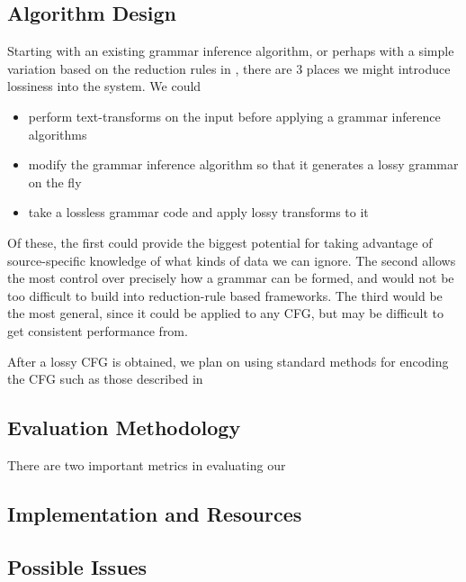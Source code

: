 \documentclass[11pt]{article}
\begin{document}
\subsection{Algorithm Design}

Starting with an existing grammar inference algorithm, or perhaps with a
simple variation based
on the reduction rules in \cite{grammarcodes}, there are 3 places we might introduce
lossiness into the system. We could
\begin{itemize}
\item perform text-transforms on the input before applying a 
      grammar inference algorithms
\item modify the grammar inference algorithm so that it generates a lossy
      grammar on the fly
\item take a lossless grammar code and apply lossy transforms to it
\end{itemize}

Of these, the first could provide the biggest potential for taking advantage of
source-specific knowledge of what kinds of data we can ignore. The second
allows the most control over precisely how a grammar can be formed, and would not
be too difficult to build into reduction-rule based frameworks. The third would
be the most general, since it could be applied to any CFG, but may be difficult
to get consistent performance from.

After a lossy CFG is obtained, we plan on using standard methods for encoding the CFG
such as those described in \cite{sequitur2}

\subsection{Evaluation Methodology}

There are two important metrics in evaluating our 

\subsection{Implementation and Resources}

\subsection{Possible Issues}

\nocite{*}


\end{document}
